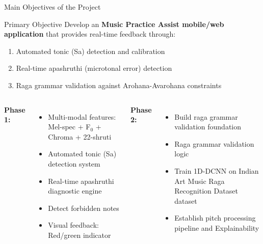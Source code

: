 \documentclass[aspectratio=169,11pt]{beamer}
\begin{document}
	\begin{frame}{Main Objectives of the Project}
		
		\begin{block}{Primary Objective}
			Develop an \textbf{Music Practice Assist mobile/web application} that provides real-time feedback through:
			\begin{enumerate}
				\item Automated tonic (Sa) detection and calibration
				\item Real-time apashruthi (microtonal error) detection
				\item Raga grammar validation against Arohana-Avarohana constraints
			\end{enumerate}
		\end{block}
		
		\vspace{0.2cm}
		
		\begin{columns}[t]
			\textbf{Phase 1:}
			\begin{itemize}
				\footnotesize
                \item Multi-modal features: Mel-spec + F$_0$ + Chroma + 22-shruti
				\item Automated tonic (Sa) detection system
				\item Real-time apashruthi diagnostic engine
                \item Detect forbidden notes
				\item Visual feedback: Red/green indicator
                
				
			\end{itemize}
			
			\textbf{Phase 2:}
			\begin{itemize}
				\footnotesize
                \item Build raga grammar validation foundation
				\item Raga grammar validation logic
				\item Train 1D-DCNN on Indian Art Music Raga Recognition Dataset dataset
				\item Establish pitch processing pipeline and Explainability
			\end{itemize}
		\end{columns}
	\end{frame}
	
\end{document}
